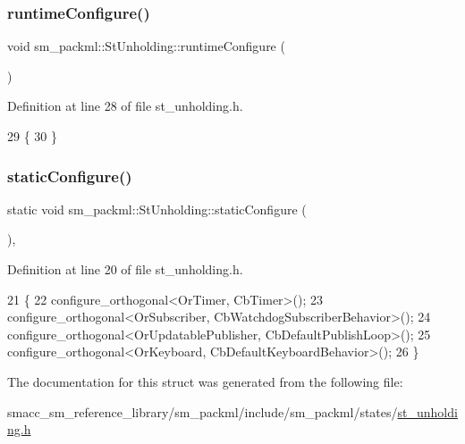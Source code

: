 \subsubsection{\texorpdfstring{runtime\+Configure()}{runtimeConfigure()}}
{\footnotesize\ttfamily void sm\+\_\+packml\+::\+St\+Unholding\+::runtime\+Configure (\begin{DoxyParamCaption}{ }\end{DoxyParamCaption})\hspace{0.3cm}{\ttfamily [inline]}}



Definition at line 28 of file st\+\_\+unholding.\+h.


\begin{DoxyCode}
29     \{
30     \}
\end{DoxyCode}
\mbox{\label{structsm__packml_1_1StUnholding_aa4784965cafac37bf397fce056f7b02b}} 
\subsubsection{\texorpdfstring{static\+Configure()}{staticConfigure()}}
{\footnotesize\ttfamily static void sm\+\_\+packml\+::\+St\+Unholding\+::static\+Configure (\begin{DoxyParamCaption}{ }\end{DoxyParamCaption})\hspace{0.3cm}{\ttfamily [inline]}, {\ttfamily [static]}}



Definition at line 20 of file st\+\_\+unholding.\+h.


\begin{DoxyCode}
21     \{
22         configure\_orthogonal<OrTimer, CbTimer>();   
23         configure\_orthogonal<OrSubscriber, CbWatchdogSubscriberBehavior>();
24         configure\_orthogonal<OrUpdatablePublisher, CbDefaultPublishLoop>();
25         configure\_orthogonal<OrKeyboard, CbDefaultKeyboardBehavior>();
26     \}
\end{DoxyCode}


The documentation for this struct was generated from the following file\+:\begin{DoxyCompactItemize}
\item 
smacc\+\_\+sm\+\_\+reference\+\_\+library/sm\+\_\+packml/include/sm\+\_\+packml/states/\hyperlink{st__unholding_8h}{st\+\_\+unholding.\+h}\end{DoxyCompactItemize}
